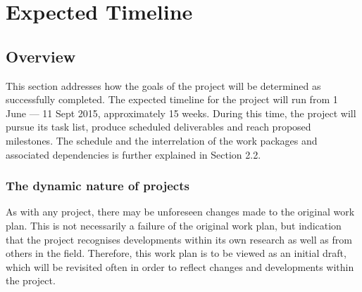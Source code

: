 \documentclass[a4paper]{article}
\begin{document}



\pagebreak 

\section{Expected Timeline}

\subsection{Overview}

This section addresses how the goals of the project will be determined as successfully completed.
The expected timeline for the project will run from 1 June --- 11 Sept 2015, approximately 15 weeks.
During this time, the project will pursue its task list, produce scheduled deliverables and reach
proposed milestones. The schedule and the interrelation of the work packages and associated
dependencies is further explained in Section 2.2.

\subsubsection{The dynamic nature of projects}

As with any project, there may be unforeseen changes made to the original work plan. This is not
necessarily a failure of the original work plan, but indication that the project recognises
developments within its own research as well as from others in the field. Therefore, this work plan
is to be viewed as an initial draft, which will be revisited often in order to reflect changes and
developments within the project.
\end{document}
